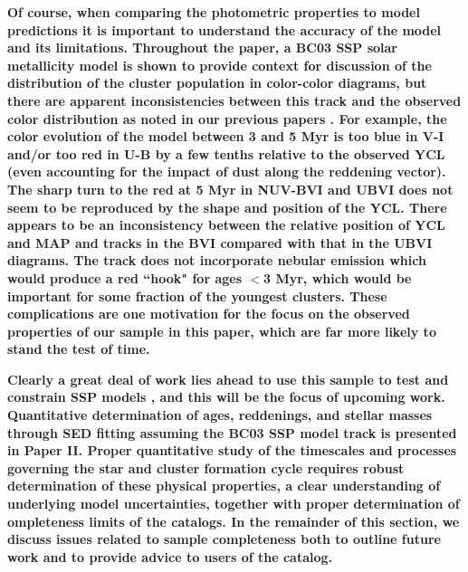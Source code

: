 \documentclass[linenumbers]{aastex63}
\begin{document}
\textbf{ Of course, when comparing the photometric properties to model predictions it is important to understand the accuracy of the model and its limitations. Throughout the paper, a BC03 SSP solar metallicity model is shown to provide context for discussion of the distribution of the cluster population in color-color diagrams, but there are apparent inconsistencies between this track and the observed color distribution as noted in our previous papers \citep[e.g.,][]{turner_phangs-hst_2021, deger_bright_2022}.  For example, the color evolution of the model between 3 and 5 Myr is too blue in V-I and/or too red in U-B by a few tenths relative to the observed YCL (even accounting for the impact of dust along the reddening vector).  The sharp turn to the red at 5 Myr in NUV-BVI and UBVI does not seem to be reproduced by the shape and position of the YCL.   There appears to be an inconsistency between the relative position of YCL and MAP and tracks in the BVI compared with that in the UBVI diagrams.  The track does not incorporate nebular emission which would produce a red ``hook" for ages $<$3 Myr, which would be important for some fraction of the youngest clusters.  These complications are one motivation for the focus on the observed properties of our sample in this paper, which are far more likely to stand the test of time.}

\textbf{Clearly a great deal of work lies ahead to use this sample to test and constrain SSP models \citep[e.g.,][and references therein]{wofford_comprehensive_2016}, and this will be the focus of upcoming work.  Quantitative determination of ages, reddenings, and stellar masses through SED fitting assuming the BC03 SSP model track is presented in Paper II. Proper quantitative study of the timescales and processes governing the star and cluster formation cycle requires robust determination of these physical properties, a clear understanding of underlying model uncertainties, together with proper determination of  ompleteness limits of the catalogs.  In the remainder of this section, we  discuss issues related to sample completeness both to outline future work and to provide advice to users of the catalog.}







\end{document}
